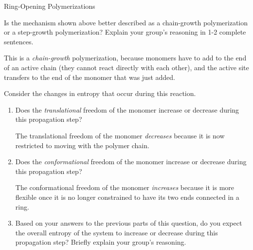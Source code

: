 \begin{activity}{Ring-Opening Polymerizations}
\begin{model}
	
	
\end{model}


\begin{ctqs}

	\question Is the mechanism shown above better described as a chain-growth polymerization or a step-growth polymerization?  Explain your group's reasoning in 1-2 complete sentences.
			
				\begin{solution}[1in]
					This is a \emph{chain-growth} polymerization, because monomers have to add to the end of an active chain (they cannot react directly with each other), and the active site transfers to the end of the monomer that was just added.
				\end{solution}
	
	\question Consider the changes in entropy that occur during this reaction.
	
		\begin{enumerate}
			
			\item Does the \textit{translational} freedom of the monomer increase or decrease during this propagation step?  %
			
				\begin{solution}[0.3in]
					The translational freedom of the monomer \textit{decreases} because it is now restricted to moving with the polymer chain.
				\end{solution}
			
			\item Does the \textit{conformational} freedom of the monomer increase or decrease during this propagation step?  %
			
				\begin{solution}[0.3in]
					The conformational freedom of the monomer \textit{increases} because it is more flexible once it is no longer constrained to have its two ends connected in a ring.
				\end{solution}
			
			\item Based on your answers to the previous parts of this question, do you expect the overall entropy of the system to increase or decrease during this propagation step?  Briefly explain your group's reasoning.
			

\end{enumerate}
\end{ctqs}
\end{activity}
